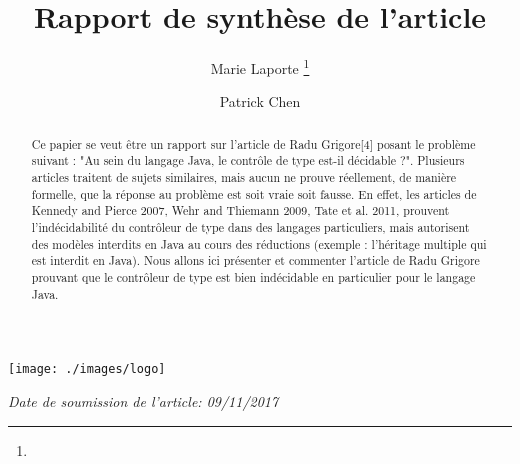 \documentclass{RITA}
\title{Rapport de synthèse de l'article}
\author{
Marie Laporte
\footnote{}
\and
Patrick Chen
\footnotemark[1]
}
\theoremstyle{definition}
\begin{document}
\begin{center}
	\texttt{[image: ./images/logo]}~\\
\end{center}
\maketitle
\begin{center}                        
    \textit{Date de soumission de l'article: 09/11/2017}
\end{center}
\begin{abstract}
Ce papier se veut être un rapport sur l'article de Radu Grigore[4] posant le problème suivant :
"Au sein du langage Java, le contrôle de type est-il décidable ?". Plusieurs articles traitent de sujets similaires, mais aucun ne prouve réellement, de manière formelle, que la réponse au problème est soit vraie soit fausse. En effet, les articles de Kennedy and Pierce 2007, Wehr and Thiemann 2009, Tate et al. 2011, prouvent l'indécidabilité du contrôleur de type dans des langages particuliers, mais autorisent des modèles interdits en Java au cours des réductions (exemple : l'héritage multiple qui est interdit en Java). Nous allons ici présenter et commenter l'article de Radu Grigore prouvant que le contrôleur de type est bien indécidable en particulier pour le langage Java.
\end{abstract}
\end{document}
